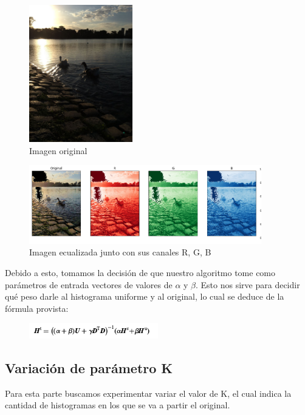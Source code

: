 \documentclass[10pt, a4paper]{article}
\begin{document}
\begin{figure}[H]
	\centering
        \includegraphics[width=0.4\textwidth]{patitos1.jpg}
        \caption{Imagen original}
\end{figure}
\begin{figure}[H]
	\centering
        \includegraphics[width=0.9\textwidth]{patitos-alpha096-beta004-k3.png}
        \caption{Imagen ecualizada junto con sus canales R, G, B}
\end{figure}

Debido a esto, tomamos la decisión de que nuestro algoritmo tome como parámetros de entrada vectores de valores de $\alpha$ y $\beta$. Esto nos sirve para decidir qué peso darle al histograma uniforme y al original, lo cual se deduce de la fórmula provista:

\begin{figure}[H]
	\centering
        \includegraphics[width=0.5\textwidth]{calculo-H.png}
\end{figure}

\subsection{Variación de parámetro K}

Para esta parte buscamos experimentar variar el valor de K, el cual indica la cantidad de histogramas en los que se va a partir el original. 
\end{document}
